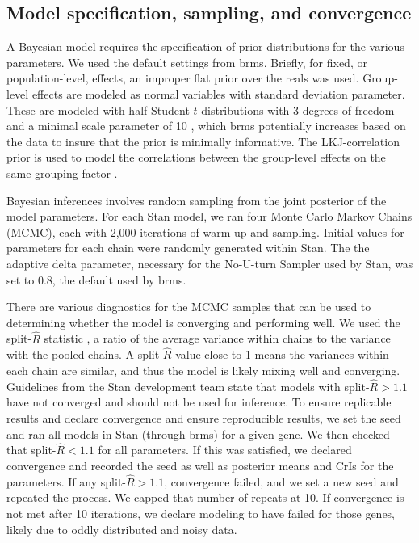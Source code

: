 \documentclass[11pt]{biorxiv}
\begin{document}
\subsection{Model specification, sampling, and convergence}

A Bayesian model requires the specification of prior distributions for the various parameters. We used the default settings from brms. Briefly, for fixed, or population-level, effects, an improper flat prior over the reals was used. Group-level effects are modeled as normal variables with standard deviation parameter. These are modeled with half Student-$t$ distributions with 3 degrees of freedom and a minimal scale parameter of 10 \citep{Gelman2006}, which brms potentially increases based on the data to insure that the prior is minimally informative. The LKJ-correlation prior is used to model the correlations between the group-level effects on the same grouping factor \citep{Lewandowski2009}.

Bayesian inferences involves random sampling from the joint posterior of the model parameters. For each Stan model, we ran four Monte Carlo Markov Chains (MCMC), each with 2,000 iterations of warm-up and sampling. Initial values for parameters for each chain were randomly generated within Stan. The the adaptive delta parameter, necessary for the No-U-turn Sampler \citep{Hoffman2014} used by Stan, was set to 0.8, the default used by brms.

There are various diagnostics for the MCMC samples that can be used to determining whether the model is converging and performing well. We used the split-$\widehat{R}$ statistic \citep{Gelman2013}, a ratio of the average variance within chains to the variance with the pooled chains. A split-$\widehat{R}$ value close to 1 means the variances within each chain are similar, and thus the model is likely mixing well and converging. Guidelines from the Stan development team state that models with split-$\widehat{R} > 1.1$ have not converged and should not be used for inference. To ensure replicable results and declare convergence and ensure reproducible results, we set the seed and ran all models in Stan (through brms) for a given gene. We then checked that split-$\widehat{R} < 1.1$ for all parameters. If this was satisfied, we declared convergence and recorded the seed as well as posterior means and CrIs for the parameters. If any split-$\widehat{R} > 1.1$, convergence failed, and we set a new seed and repeated the process. We capped that number of repeats at 10. If convergence is not met after 10 iterations, we declare modeling to have failed for those genes, likely due to oddly distributed and noisy data.
\end{document}

